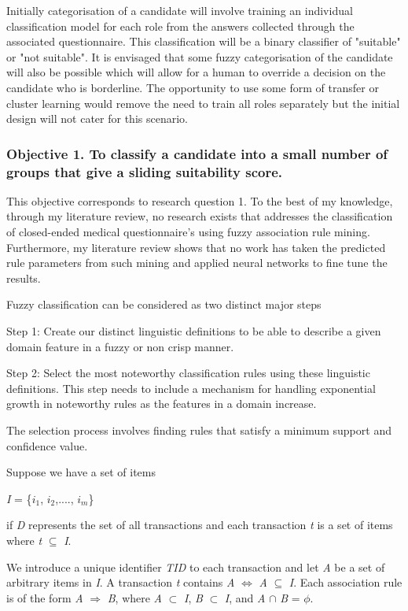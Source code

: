 Initially categorisation of a candidate will involve training an individual classification model for each role from
the answers collected through the associated questionnaire. This classification will be a binary classifier
of "suitable" or "not suitable". It is envisaged that some fuzzy categorisation of the candidate will also be
possible which will allow for a human to override a decision on the candidate who is borderline. The opportunity
to use some form of transfer or cluster learning would remove the need to train all roles separately but the initial
design will not cater for this scenario.

\subsubsection{Objective 1. To classify a candidate into a small number of groups that give a sliding suitability score.}

This objective corresponds to research question 1. To the best of my knowledge, through my literature review, no research exists that addresses the classification of closed-ended medical questionnaire's using fuzzy association rule mining. Furthermore, my literature review shows that no work has taken the predicted rule parameters from such mining and applied neural networks to fine tune the results.

Fuzzy classification can be considered as two distinct major steps

Step 1: Create our distinct linguistic definitions to be able to describe a given domain feature in a fuzzy or non crisp manner.

Step 2: Select the most noteworthy classification rules using these linguistic definitions. This step needs to include a mechanism for handling exponential growth in noteworthy rules as the features in a domain increase.

The selection process involves finding rules that satisfy a minimum support and confidence value.

Suppose we have a set of items

\textit{I} = \{$i_1$, $i_2$,...., $i_m$\}

if \textit{D} represents the set of all transactions and each transaction \textit{t} is a set of items where \textit{t} $\subseteq$ \textit{I}.

We introduce a unique identifier \textit{TID} to each transaction and let \textit{A} be a set of arbitrary items in \textit{I}. A transaction \textit{t} contains \textit{A} $\iff$ \textit{A} $\subseteq$ \textit{I}. Each association rule is of the form \textit{A} $\Rightarrow$ \textit{B}, where \textit{A} $\subset$ \textit{I}, \textit{B} $\subset$ \textit{I}, and \textit{A} $\cap$ \textit{B} = $\phi$.

